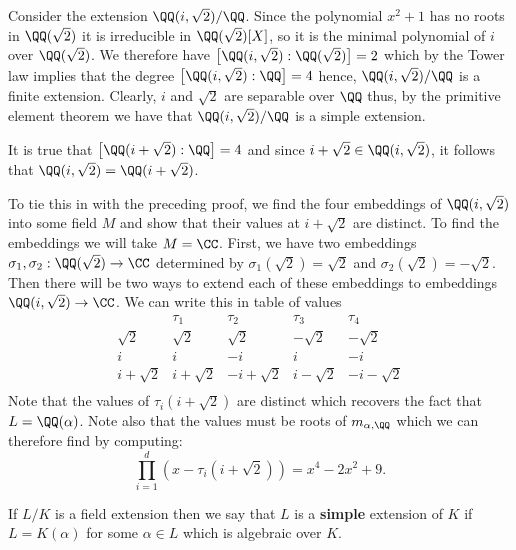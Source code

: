 \documentclass[12pt, a4paper]{article}
\begin{document}
\begin{mdexample}
    Consider the extension \(\QQ(i,\sqrt{2})/\QQ\). Since the polynomial \(x^2+1\) has no roots in \(\QQ(\sqrt{2})\) it is irreducible in \(\QQ(\sqrt{2})[X]\), so it is the minimal polynomial of \(i\) over \(\QQ(\sqrt{2})\). We therefore have \(\left[ \QQ(i,\sqrt{2}):\QQ(\sqrt{2}) \right]=2\) which by the Tower law implies that the degree \({\left[ \QQ(i,\sqrt{2}):\QQ \right]=4}\) hence, \(\QQ(i,\sqrt{2})/\QQ\) is a finite extension. Clearly, \(i\) and \(\sqrt{2}\) are separable over \(\QQ\) thus, by the primitive element theorem we have that \(\QQ(i,\sqrt{2})/\QQ\) is a simple extension.

    It is true that \(\left[ \QQ(i+\sqrt{2}):\QQ \right]=4\) and since \(i+\sqrt{2}\in \QQ(i,\sqrt{2})\), it follows that \(\QQ(i,\sqrt{2}) = \QQ(i+\sqrt{2})\).

    To tie this in with the preceding proof, we find the four embeddings of \(\QQ(i,\sqrt{2})\) into some field \(M\) and show that their values at \(i+\sqrt{2}\) are distinct. To find the embeddings we will take \(M=\CC\). First, we have two embeddings \(\sigma_1,\sigma_2 : \QQ(\sqrt{2}) \to \CC\) determined by \(\sigma_1(\sqrt{2})=\sqrt{2}\) and \(\sigma_2(\sqrt{2})=-\sqrt{2}\). Then there will be two ways to extend each of these embeddings to embeddings \(\QQ(i,\sqrt{2}) \to \CC\). We can write this in table of values 
    \[\begin{array}{c|cccc}
         & \tau_1 & \tau_2 & \tau_3 & \tau_4 \\ \hline
        \sqrt{2} & \sqrt{2} & \sqrt{2} & -\sqrt{2} & -\sqrt{2} \\
        i & i & -i & i & -i \\
        i + \sqrt{2} & i + \sqrt{2} & -i + \sqrt{2} & i - \sqrt{2} & -i - \sqrt{2} \\
    \end{array}\]
    Note that the values of \(\tau_i(i+\sqrt{2})\) are distinct which recovers the fact that \(L=\QQ(\alpha)\). Note also that the values must be roots of \(m_{\alpha,\QQ}\) which we can therefore find by computing:
    \[\prod_{i=1}^d (x-\tau_i(i+\sqrt{2})) = x^4-2x^2+9.\]
\end{mdexample}

\begin{definition}
    If \(L/K\) is a field extension then we say that \(L\) is a \textbf{simple} extension of \(K\) if \(L=K(\alpha)\) for some \(\alpha \in L\) which is algebraic over \(K\).
\end{definition}
\end{document}
